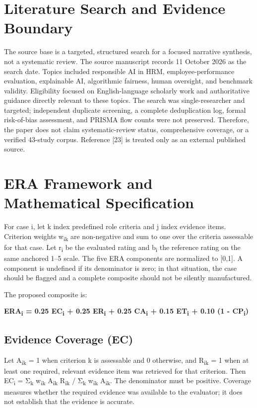 \documentclass[
  10pt,
  a4paper,
  runningheads]{llncs}
\begin{document}
\section{Literature Search and Evidence
Boundary}\label{literature-search-and-evidence-boundary}

The source base is a targeted, structured search for a focused narrative synthesis, not a systematic review. The source manuscript records 11 October 2026 as the search date. Topics included responsible AI in HRM, employee-performance evaluation, explainable AI, algorithmic fairness, human oversight, and benchmark validity. Eligibility focused on English-language scholarly work and authoritative guidance directly relevant to these topics. The search was single-researcher and targeted; independent duplicate screening, a complete deduplication log, formal risk-of-bias assessment, and PRISMA flow counts were not preserved. Therefore, the paper does not claim systematic-review status, comprehensive coverage, or a verified 43-study corpus. Reference [23] is treated only as an external published source.

\section{ERA Framework and Mathematical
Specification}\label{era-framework-and-mathematical-specification}

For case i, let k index predefined role criteria and j index evidence
items. Criterion weights w\textsubscript{i}\textsubscript{k} are non-negative and sum to one over the
criteria assessable for that case. Let r\textsubscript{i} be the evaluated rating and b\textsubscript{i}
the reference rating on the same anchored 1--5 scale. The five ERA
components are normalized to {[}0,1{]}. A component is undefined if its
denominator is zero; in that situation, the case should be flagged and a
complete composite should not be silently manufactured.

The proposed composite is:

\textbf{ERA\textsubscript{i} = 0.25 EC\textsubscript{i} + 0.25 ER\textsubscript{i} + 0.25 CA\textsubscript{i} + 0.15 ET\textsubscript{i} + 0.10 (1 -
CP\textsubscript{i})}

\subsection{Evidence Coverage (EC)}\label{evidence-coverage-ec}

Let A\textsubscript{i}\textsubscript{k} = 1 when criterion k is assessable and 0 otherwise, and R\textsubscript{i}\textsubscript{k} = 1
when at least one required, relevant evidence item was retrieved for
that criterion. Then EC\textsubscript{i} = Σ\textsubscript{k} w\textsubscript{i}\textsubscript{k} A\textsubscript{i}\textsubscript{k} R\textsubscript{i}\textsubscript{k} / Σ\textsubscript{k} w\textsubscript{i}\textsubscript{k} A\textsubscript{i}\textsubscript{k}. The denominator
must be positive. Coverage measures whether the required evidence was
available to the evaluator; it does not establish that the evidence is
accurate.
\end{document}
